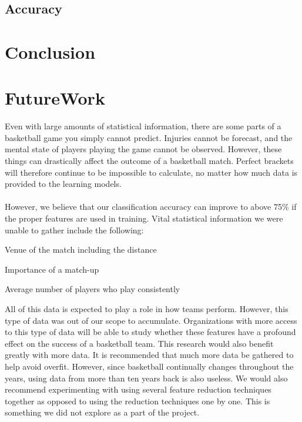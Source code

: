 \documentclass{article}
\begin{document}
\begin{multicols}{2}
	\subsection{Accuracy}
	
	\section{Conclusion}
	\section{FutureWork}	 
Even with large amounts of statistical information, there are some parts of a basketball game you simply cannot predict. Injuries cannot be forecast, and the mental state of players playing the game cannot be observed. However, these things can drastically affect the outcome of a basketball match. Perfect brackets will therefore continue to be impossible to calculate, no matter how much data is provided to the learning models.

\paragraph{}However, we believe that our classification accuracy can improve to above 75\% if the proper features are used in training. Vital statistical information we were unable to gather include the following:
\begin{list}{•}
\item
Venue of the match including the distance
\item
Importance of a match-up
\item
Average number of players who play consistently
\end{list}

All of this data is expected to play a role in how teams perform. However, this type of data was out of our scope to accumulate. Organizations with more access to this type of data will be able to study whether these features have a profound effect on the success of a basketball team. This research would also benefit greatly with more data. It is recommended that much more data be gathered to help avoid overfit. However, since basketball continually changes throughout the years, using data from more than ten years back is also useless. We would also recommend experimenting with using several feature reduction techniques together as opposed to using the reduction techniques one by one. This is something we did not explore as a part of the project.


\end{multicols}
\end{document}
